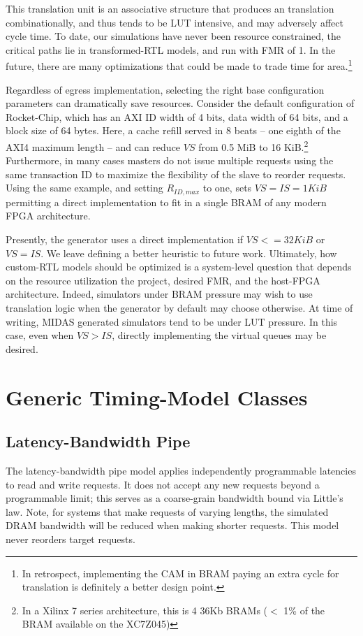 This translation unit is an associative structure that produces an translation
combinationally, and thus tends to be LUT intensive, and may adversely affect
cycle time. To date, our simulations have never been resource constrained, the
critical paths lie in transformed-RTL models, and run with FMR of 1. In the
future, there are many optimizations that could be made to trade time for
area.\footnote{In retrospect, implementing the CAM in BRAM paying an extra
cycle for translation is definitely a better design point.}

Regardless of egress implementation, selecting the right base configuration
parameters can dramatically save resources. Consider the default configuration
of Rocket-Chip, which has an AXI ID width of 4 bits, data width of 64 bits, and
a block size of 64 bytes. Here, a cache refill served in 8 beats -- one eighth
of the AXI4 maximum length -- and can reduce $VS$ from 0.5 MiB to 16
KiB.\footnote{In a Xilinx 7 series architecture, this is 4 36Kb BRAMs ($<$ 1\%
of the BRAM available on the XC7Z045)} Furthermore, in many cases masters do not
issue multiple requests using the same transaction ID to maximize the
flexibility of the slave to reorder requests. Using the same example, and
setting $R_{ID,max}$ to one, sets $VS = IS = 1 KiB$ permitting a direct
implementation to fit in a single BRAM of any modern FPGA architecture.

Presently, the generator uses a direct implementation if $VS <= 32 KiB$ or $VS
= IS$. We leave defining a better heuristic to future work. Ultimately, how
custom-RTL models should be optimized is a system-level question that
depends on the resource utilization the project, desired FMR, and
the host-FPGA architecture. Indeed, simulators under BRAM pressure may wish to use
translation logic when the generator by default may choose otherwise. At time
of writing, MIDAS generated simulators tend to be under LUT pressure. In this
case, even when $VS > IS$, directly implementing the virtual queues may be
desired.

\section{Generic Timing-Model Classes}

\subsection{Latency-Bandwidth Pipe}

The latency-bandwidth pipe model applies independently programmable latencies
to read and write requests. It does not accept any new requests beyond a
programmable limit; this serves as a coarse-grain bandwidth bound via Little's
law. Note, for systems that make requests of varying lengths, the simulated
DRAM bandwidth will be reduced when making shorter requests. This model never
reorders target requests.

